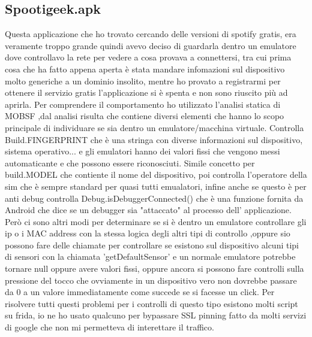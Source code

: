\documentclass[a4paper,11pt]{article}
\theoremstyle{plain}
\theoremstyle{definition}
\theoremstyle{remark}
\begin{document}
\subsection{Spootigeek.apk}
Questa applicazione che ho trovato cercando delle versioni di spotify gratis, era veramente troppo grande quindi avevo deciso di guardarla dentro un emulatore dove controllavo la rete per vedere a cosa provava a connettersi, tra cui prima cosa che ha fatto appena aperta è stata mandare infomazioni sul dispositivo molto generiche a un dominio insolito, mentre ho provato a registrarmi per ottenere il servizio gratis l'applicazione si è spenta e non sono riuscito più ad aprirla. Per comprendere il comportamento ho utilizzato l'analisi statica di MOBSF ,dal analisi risulta che contiene diversi elementi che hanno lo scopo principale di individuare se sia dentro un emulatore/macchina virtuale. Controlla Build.FINGERPRINT che è una stringa con diverse informazioni sul dispositivo, sistema operativo... e gli emulatori hanno dei valori fissi che vengono messi automaticante e che possono essere riconosciuti. Simile concetto per build.MODEL che contiente il nome del dispositivo, poi controlla l'operatore della sim che è sempre standard per quasi tutti emualatori, infine anche se questo è per anti debug controlla Debug.isDebuggerConnected() che è una funzione fornita da Android che dice se un debugger sia "attaccato" al processo dell' applicazione. Però ci sono altri modi per determinare se si è dentro un emulatore controllare gli ip o i MAC address con la stessa logica degli altri tipi di controllo ,oppure sio possono fare delle chiamate per controllare se esistono sul dispositivo alcuni tipi di sensori con la chiamata 'getDefaultSensor' e un normale emulatore potrebbe tornare null oppure avere valori fissi, oppure ancora si possono fare controlli sulla pressione del tocco che ovviamente in un dispositivo vero non dovrebbe passare da 0 a un valore immediatamente come succede se si facesse un click. Per risolvere tutti questi problemi per i controlli di questo tipo esistono molti script su frida, io ne ho usato qualcuno per bypassare SSL pinning fatto da molti servizi di google che non mi permetteva di interettare il traffico.
\end{document}
